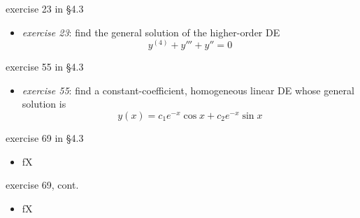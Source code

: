 \documentclass{beamer}
\begin{document}
\begin{frame}{exercise 23 in \S4.3}

\begin{itemize}
\item \emph{exercise 23}:  find the general solution of the higher-order DE
    $$y^{(4)} + y''' + y'' = 0$$
\end{itemize}

\vspace{60mm}
\end{frame}


\begin{frame}{exercise 55 in \S4.3}

\begin{itemize}
\item \emph{exercise 55}:  find a constant-coefficient, homogeneous linear DE whose general solution is
    $$y(x) = c_1 e^{-x} \cos x + c_2 e^{-x} \sin x$$
\end{itemize}

\vspace{60mm}
\end{frame}


\begin{frame}{exercise 69 in \S4.3}

\begin{itemize}
\item fX
\end{itemize}
\end{frame}


\begin{frame}{exercise 69, cont.}

\begin{itemize}
\item fX
\end{itemize}
\end{frame}
\end{document}
